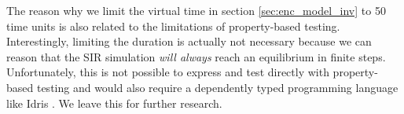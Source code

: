 The reason why we limit the virtual time in section \ref{sec:enc_model_inv} to 50 time units is also related to the limitations of property-based testing. Interestingly, limiting the duration is actually not necessary because we can reason that the SIR simulation \textit{will always} reach an equilibrium in finite steps. Unfortunately, this is not possible to express and test directly with property-based testing and would also require a dependently typed programming language like Idris \cite{brady_idris_2013,brady_type-driven_2017}. We leave this for further research.